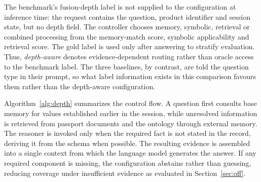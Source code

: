 \documentclass[conference]{IEEEtran}
\newcommand{\rev}[1]{\hl{#1}}
\newcommand{\revg}[1]{\textcolor{reviewgreen}{#1}}
\begin{document}
\revg{The benchmark's fusion-depth label is not supplied to the configuration
at inference time: the request contains the question, product identifier and
session state, but no depth field. The controller chooses memory, symbolic,
retrieval or combined processing from the memory-match score, symbolic
applicability and retrieval score. The gold label is used only after answering
to stratify evaluation. Thus, \emph{depth-aware} denotes evidence-dependent
routing rather than oracle access to the benchmark label. \revg{The three
baselines, by contrast, are told the question type in their prompt, so what
label information exists in this comparison favours them rather than the
depth-aware configuration.}}




Algorithm~\ref{alg:depth} summarizes the control flow. A question first consults base memory for values established earlier in the session, while unresolved information is retrieved from passport documents and the ontology through external memory. The reasoner is invoked only when the required fact is not stated in the record, deriving it from the schema when possible. The resulting evidence is assembled into a single context from which the language model generates the answer. If any required component is missing, the configuration abstains rather than guessing, reducing coverage under insufficient evidence as evaluated in Section~\ref{sec:off}.



\end{document}
